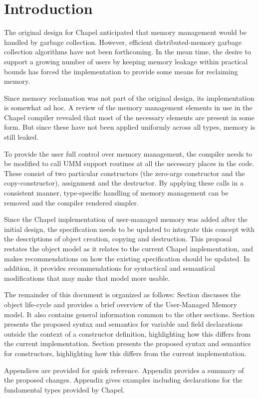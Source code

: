 \section{Introduction}

The original design for Chapel anticipated that memory management would be handled
by garbage collection.  However, efficient distributed-memory garbage collection
algorithms have not been forthcoming.  In the mean time, the desire to support a growing
number of users by keeping memory leakage within practical bounds has forced the
implementation to provide some means for reclaiming memory.  

Since memory reclamation was not part of the original design, its implementation is somewhat
ad hoc.  A review of the memory management elements in use in the Chapel compiler revealed
that most of the necessary elements are present in some form.  But since these have not
been applied uniformly across all types, memory is still leaked.

To provide the user full control over memory management, the compiler needs to be modified
to call UMM support routines at all the necessary places in the code.  These consist
of two particular constructors (the zero-args constructor and the copy-constructor),
assignment and the destructor.  By applying these calls in a consistent
manner, type-specific handling of memory management can be removed and the compiler
rendered simpler.

Since the Chapel implementation of user-managed memory was added after the initial design,
the specification needs to be updated to integrate this concept with the descriptions of
object creation, copying and destruction.  This proposal restates the object
model as it relates to the current Chapel implementation, and makes recommendations on how
the existing specification should be updated.  In addition, it provides recommendations for
syntactical and semantical modifications that may make that model more usable.

The remainder of this document is organized as follows: Section  discusses
the object life-cycle and provides a brief overview of the User-Managed Memory model.  It
also contains general information common to the other sections.  Section
 presents the proposed syntax and semantics for variable and field
declarations outside the context of a constructor definition, highlighting how this
differs from the current implementation.  Section  presents the
proposed syntax and semantics for constructors, highlighting how this differs from the
current implementation.

Appendices are provided for quick reference.  Appendix  provides a summary of the
proposed changes.  Appendix  gives examples including declarations for the
fundamental types provided by Chapel.

